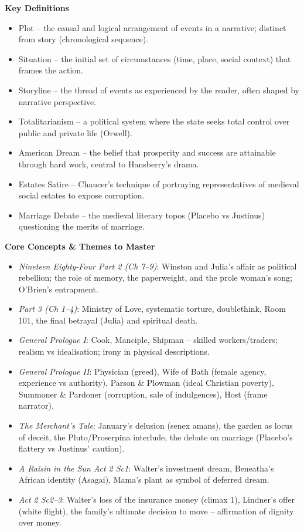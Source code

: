 \documentclass[11pt]{article}
\newcommand{\cle}[1]{{\popxbold\color{popdark}#1}}
\begin{document}
\begin{bilan}
\textbf{Key Definitions}
\begin{itemize}
  \item \cle{Plot} -- the causal and logical arrangement of events in a narrative; distinct from \cle{story} (chronological sequence).
  \item \cle{Situation} -- the initial set of circumstances (time, place, social context) that frames the action.
  \item \cle{Storyline} -- the thread of events as experienced by the reader, often shaped by narrative perspective.
  \item \cle{Totalitarianism} -- a political system where the state seeks total control over public and private life (Orwell).
  \item \cle{American Dream} -- the belief that prosperity and success are attainable through hard work, central to Hansberry's drama.
  \item \cle{Estates Satire} -- Chaucer's technique of portraying representatives of medieval social estates to expose corruption.
  \item \cle{Marriage Debate} -- the medieval literary topos (Placebo vs Justinus) questioning the merits of marriage.
\end{itemize}

\textbf{Core Concepts \& Themes to Master}
\begin{itemize}
  \item \emph{Nineteen Eighty-Four Part 2 (Ch 7--9)}: Winston and Julia's affair as political rebellion; the role of memory, the paperweight, and the prole woman's song; O'Brien's entrapment.
  \item \emph{Part 3 (Ch 1--4)}: Ministry of Love, systematic torture, \cle{doublethink}, \cle{Room 101}, the final betrayal (Julia) and spiritual death.
  \item \emph{General Prologue I}: Cook, Manciple, Shipman -- skilled workers/traders; realism vs idealisation; irony in physical descriptions.
  \item \emph{General Prologue II}: Physician (greed), Wife of Bath (female agency, experience vs authority), Parson \& Plowman (ideal Christian poverty), Summoner \& Pardoner (corruption, sale of indulgences), Host (frame narrator).
  \item \emph{The Merchant's Tale}: January's delusion (senex amans), the garden as locus of deceit, the Pluto/Proserpina interlude, the debate on marriage (Placebo's flattery vs Justinus' caution).
  \item \emph{A Raisin in the Sun Act 2 Sc1}: Walter's investment dream, Beneatha's African identity (Asagai), Mama's plant as symbol of deferred dream.
  \item \emph{Act 2 Sc2--3}: Walter's loss of the insurance money (climax 1), Lindner's offer (white flight), the family's ultimate decision to move -- affirmation of dignity over money.
\end{itemize}


\end{bilan}
\end{document}
